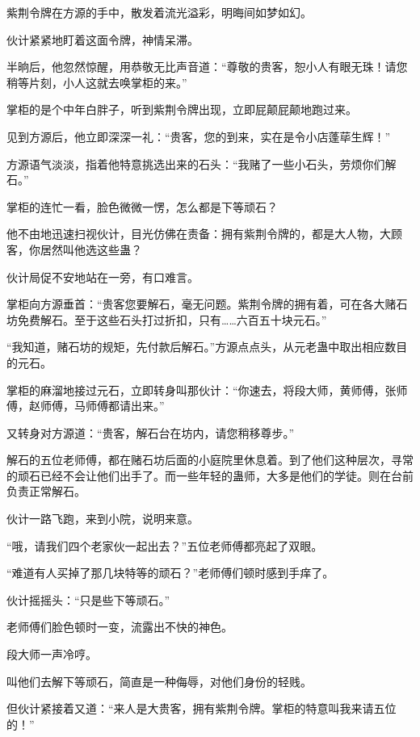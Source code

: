 
\begin{this_body}

紫荆令牌在方源的手中，散发着流光溢彩，明晦间如梦如幻。

伙计紧紧地盯着这面令牌，神情呆滞。

半晌后，他忽然惊醒，用恭敬无比声音道：“尊敬的贵客，恕小人有眼无珠！请您稍等片刻，小人这就去唤掌柜的来。”

掌柜的是个中年白胖子，听到紫荆令牌出现，立即屁颠屁颠地跑过来。

见到方源后，他立即深深一礼：“贵客，您的到来，实在是令小店蓬荜生辉！”

方源语气淡淡，指着他特意挑选出来的石头：“我赌了一些小石头，劳烦你们解石。”

掌柜的连忙一看，脸色微微一愣，怎么都是下等顽石？

他不由地迅速扫视伙计，目光仿佛在责备：拥有紫荆令牌的，都是大人物，大顾客，你居然叫他选这些蛊？

伙计局促不安地站在一旁，有口难言。

掌柜向方源垂首：“贵客您要解石，毫无问题。紫荆令牌的拥有着，可在各大赌石坊免费解石。至于这些石头打过折扣，只有……六百五十块元石。”

“我知道，赌石坊的规矩，先付款后解石。”方源点点头，从元老蛊中取出相应数目的元石。

掌柜的麻溜地接过元石，立即转身叫那伙计：“你速去，将段大师，黄师傅，张师傅，赵师傅，马师傅都请出来。”

又转身对方源道：“贵客，解石台在坊内，请您稍移尊步。”

解石的五位老师傅，都在赌石坊后面的小庭院里休息着。到了他们这种层次，寻常的顽石已经不会让他们出手了。而一些年轻的蛊师，大多是他们的学徒。则在台前负责正常解石。

伙计一路飞跑，来到小院，说明来意。

“哦，请我们四个老家伙一起出去？”五位老师傅都亮起了双眼。

“难道有人买掉了那几块特等的顽石？”老师傅们顿时感到手痒了。

伙计摇摇头：“只是些下等顽石。”

老师傅们脸色顿时一变，流露出不快的神色。

段大师一声冷哼。

叫他们去解下等顽石，简直是一种侮辱，对他们身份的轻贱。

但伙计紧接着又道：“来人是大贵客，拥有紫荆令牌。掌柜的特意叫我来请五位的！”


\end{this_body}
